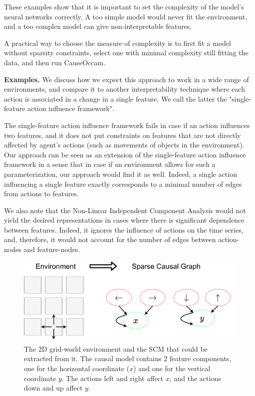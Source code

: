 \documentclass[a4paper,11pt,oneside]{report}
\newcommand{\sysname}{CauseOccam\xspace}
\begin{document}
These examples show that it is important to set the complexity of the model's neural networks correctly. A too simple model would never fit the environment, and a too complex model can give non-interpretable features.

A practical way to choose the measure of complexity is to first fit a model without sparsity constraints, select one with minimal complexity still fitting the data, and then run \sysname.

{\bf Examples.} We discuss how we expect this approach to work in a wide range of environments, and compare it to another interpretability technique where each action is associated \cite{Thomas2018} in a change in a single feature. We call the latter the "single-feature action influence framework".

The single-feature action influence framework fails in case if an action influences two features, and it does not put constraints on features that are not directly affected by agent's actions (such as movements of objects in the environment). Our approach can be seen as an extension of the single-feature action influence framework in a sense that in case if an environment allows for such a parameterization, our approach would find it as well. Indeed, a single action influencing a single feature exactly corresponds to a minimal number of edges from actions to features.

We also note that the Non-Linear Independent Component Analysis \cite{Dinh2015,Hyvarinen2019} would not yield the desired representations in cases where there is significant dependence between features. Indeed, it ignores the influence of actions on the time series, and, therefore, it would not account for the number of edges between action-nodes and feature-nodes.

\begin{figure}
    \centering
    \includegraphics[width=0.7\linewidth]{diagrams/env_gw}
    \caption{The 2D grid-world environment and the SCM that could be extracted from it. The causal model contains $2$ feature components, one for the horizontal coordinate ($x$) and one for the vertical coordinate $y$. The actions left and right affect $x$, and the actions down and up affect $y$.}
    \label{fig:env_scm_gw}
\end{figure}
\end{document}
